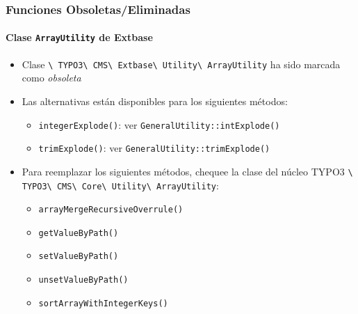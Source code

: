\begin{frame}[fragile]
	\frametitle{Funciones Obsoletas/Eliminadas}
	\framesubtitle{Clase \texttt{ArrayUtility} de Extbase}

	\begin{itemize}
		\item Clase
			\texttt{\textbackslash
				TYPO3\textbackslash
				CMS\textbackslash
				Extbase\textbackslash
				Utility\textbackslash
				ArrayUtility} ha sido marcada como \textit{obsoleta}

		\item Las alternativas están disponibles para los siguientes métodos:

			\begin{itemize}
				\item \texttt{integerExplode()}: ver \texttt{GeneralUtility::intExplode()}
				\item \texttt{trimExplode()}: ver \texttt{GeneralUtility::trimExplode()}
			\end{itemize}

		\item Para reemplazar los siguientes métodos, chequee la clase del núcleo TYPO3
			\texttt{\textbackslash
				TYPO3\textbackslash
				CMS\textbackslash
				Core\textbackslash
				Utility\textbackslash
				ArrayUtility}:

			\begin{itemize}
				\item \texttt{arrayMergeRecursiveOverrule()}
				\item \texttt{getValueByPath()}
				\item \texttt{setValueByPath()}
				\item \texttt{unsetValueByPath()}
				\item \texttt{sortArrayWithIntegerKeys()}
			\end{itemize}

	\end{itemize}

\end{frame}




